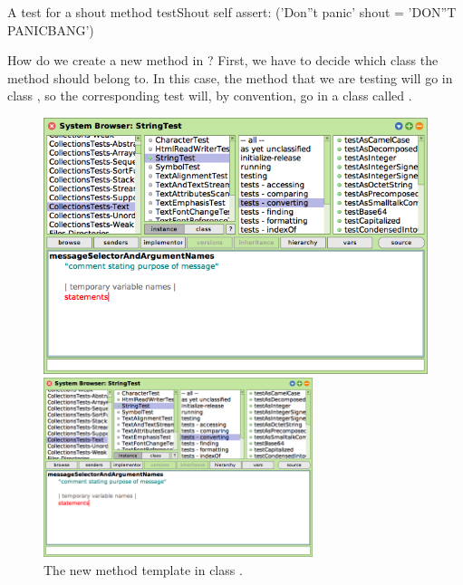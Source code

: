 \documentclass[a4paper,10pt,twoside]{book}
\begin{document}
\begin{method}[testShout]{A test for a shout method}
testShout
	self assert: ('Don''t panic' shout = 'DON''T PANICBANG')
\end{method} %

How do we create a new method in \sq?   First, we have to decide which class the method should belong to.
In this case, the  method that we are testing will go in class , so the corresponding test will, by convention, go in a class called .



\begin{figure}[hbt]
\ifluluelse
	{\centerline {\includegraphics[width=\textwidth]{StringTest-newMethodTemplate}}}
	{\centerline {\includegraphics[width=0.7\textwidth]{StringTest-newMethodTemplate}}}
\caption{The new method template in class .
\label{fig:newMethodTemplate}}
\end{figure}
\end{document}
